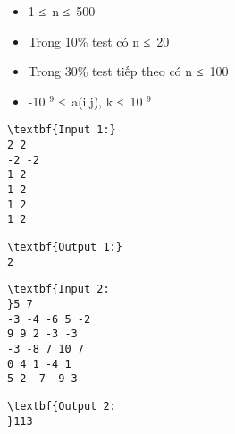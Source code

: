 \begin{itemize}
	\item 1 ≤ n ≤ 500
	\item Trong 10\% test có n ≤ 20
	\item Trong 30\% test tiếp theo có n ≤ 100
	\item -10 $^ 9 $ ≤ a(i,j), k ≤ 10 $^ 9 $
\end{itemize}
\begin{itemize}
\end{itemize}
\begin{verbatim}
\textbf{Input 1:}
2 2
-2 -2
1 2
1 2
1 2
1 2 \end{verbatim}
\begin{verbatim}
\textbf{Output 1:}
2
\end{verbatim}
\begin{verbatim}
\textbf{Input 2:
}5 7
-3 -4 -6 5 -2
9 9 2 -3 -3
-3 -8 7 10 7
0 4 1 -4 1
5 2 -7 -9 3
\end{verbatim}
\begin{verbatim}
\textbf{Output 2:
}113\end{verbatim}